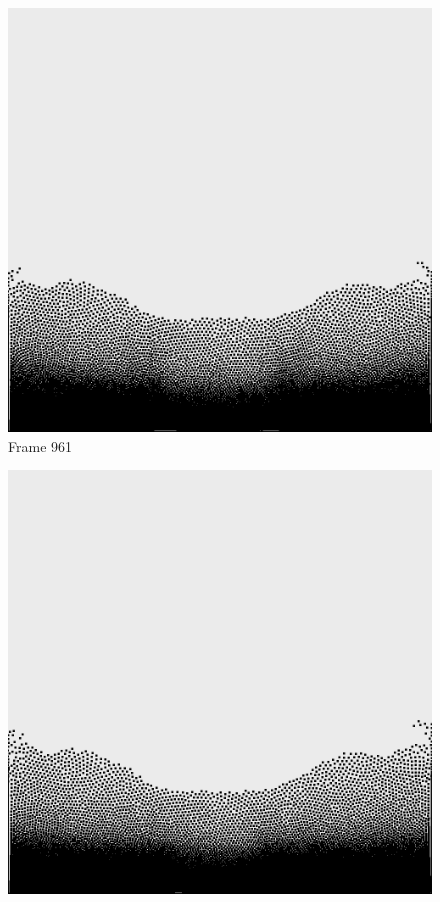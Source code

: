 \documentclass[a4paper, 12pt, oneside]{book}
\begin{document}
\begin{figure}[!ht]
    \addvspace{0.5ex}
        \begin{center}
            \includegraphics[width=\linewidth]{images/test_case_1/961.png}
            Frame 961
        \end{center}
    \endminipage
    \hfill
        \begin{center}
            \includegraphics[width=\linewidth]{images/test_case_1/981.png}

\end{center}
\end{figure}
\end{document}
